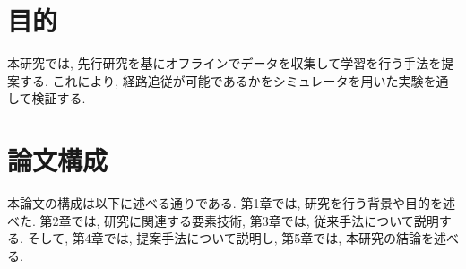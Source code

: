 




\newpage
\section{目的}
本研究では, 先行研究を基にオフラインでデータを収集して学習を行う手法を提案する. これにより, 経路追従が可能であるかをシミュレータを用いた実験を通して検証する. 

\section{論文構成}
本論文の構成は以下に述べる通りである. 第1章では, 研究を行う背景や目的を述べた. 第2章では, 研究に関連する要素技術, 第3章では, 従来手法について説明する. そして, 第4章では, 提案手法について説明し, 第5章では, 本研究の結論を述べる. 
     
